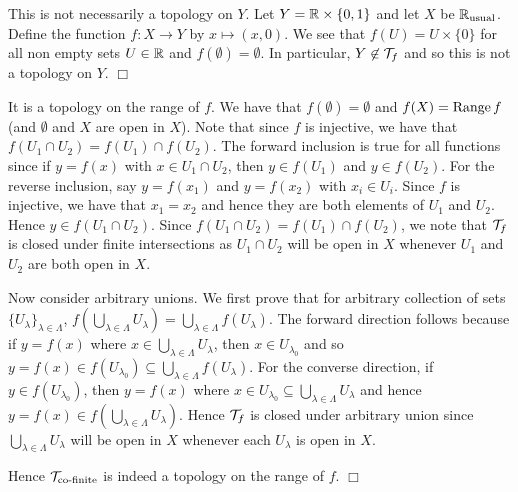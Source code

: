 \documentclass{article}
\begin{document}
 {
    This is not necessarily a topology on $Y$. Let $Y = \mathbb{R}\times\{0,1\}$ and let $X$ be $\mathbb{R}_{\text{usual}}$. Define the function $f: X\to Y$ by $x\mapsto (x,0)$. We see that $f(U) = U\times \{0\}$ for all non empty sets $U\in \mathbb{R}$ and $f(\emptyset) = \emptyset$. In particular, $Y\not\in \mathcal{T}_{f}$ and so this is not a topology on $Y$. $\Box$

    It is a topology on the range of $f$. We have that $f(\emptyset) = \emptyset$ and $f(X) = \operatorname{Range} f$ (and $\emptyset$ and $X$ are open in $X$). Note that since $f$ is injective, we have that $f(U_{1}\cap U_{2}) = f(U_{1})\cap f(U_{2})$. The forward inclusion is true for all functions since if $y = f(x)$ with $x\in U_{1}\cap U_{2}$, then $y\in f(U_{1})$ and $y\in f(U_{2})$. For the reverse inclusion, say $y = f(x_{1})$ and $y = f(x_{2})$ with $x_{i}\in U_{i}$. Since $f$ is injective, we have that $x_{1} = x_{2}$ and hence they are both elements of $U_{1}$ and $U_{2}$. Hence $y\in f(U_{1}\cap U_{2})$. Since  $f(U_{1}\cap U_{2}) = f(U_{1})\cap f(U_{2})$, we note that $\mathcal{T}_{f}$ is closed under finite intersections as $U_{1}\cap U_{2}$ will be open in $X$ whenever $U_{1}$ and $U_{2}$ are both open in $X$.

    Now consider arbitrary unions. We first prove that for arbitrary collection of sets $\{U_{\lambda}\}_{\lambda\in\Lambda}$, $f\left(\bigcup_{\lambda\in\Lambda}U_{\lambda}\right) = \bigcup_{\lambda\in \Lambda}f(U_{\lambda})$. The forward direction follows because if $y = f(x)$ where $x\in \bigcup_{\lambda\in \Lambda}U_{\lambda}$, then $x\in U_{\lambda_{0}}$ and so $y =f(x)\in f(U_{\lambda_{0}})\subseteq \bigcup_{\lambda\in \Lambda}f(U_{\lambda})$. For the converse direction, if $y \in f(U_{\lambda_{0}})$, then $y = f(x)$ where $x\in U_{\lambda_{0}}\subseteq \bigcup_{\lambda\in \Lambda}U_{\lambda}$ and hence $y= f(x)\in f\left(\bigcup_{\lambda\in\Lambda}U_{\lambda}\right)$. Hence $\mathcal{T}_{f}$ is closed under arbitrary union since $\bigcup_{\lambda\in\Lambda}U_{\lambda}$ will be open in $X$ whenever each $U_{\lambda}$ is open in $X$.
    
    Hence $\mathcal{T}_{\text{co-finite}}$ is indeed a topology on the range of $f$. $\Box$
}
\end{document}
